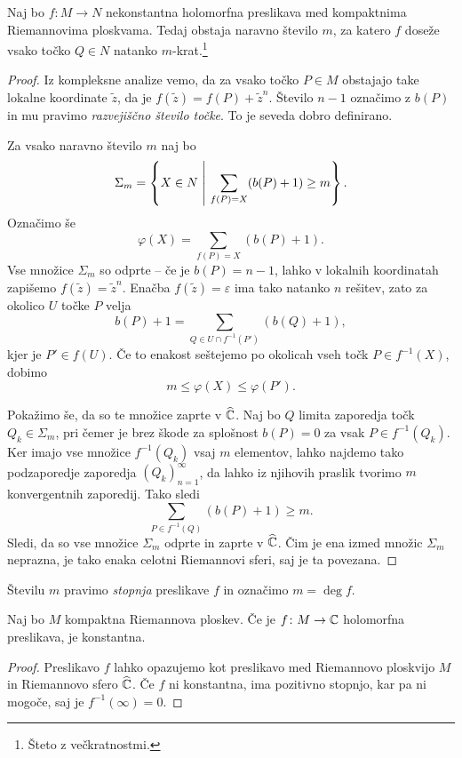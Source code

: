 \begin{trditev}
\label{td:deg}
Naj bo $f \colon M \to N$ nekonstantna holomorfna preslikava med
kompaktnima Riemannovima ploskvama. Tedaj obstaja naravno število
$m$, za katero $f$ doseže vsako točko $Q \in N$ natanko
$m$-krat.\footnote{Šteto z večkratnostmi.}
\end{trditev}

\begin{proof}
Iz kompleksne analize vemo, da za vsako točko $P \in M$ obstajajo
take lokalne koordinate $\tilde{z}$, da je
$f(\tilde{z}) = f(P) + \tilde{z}^n$. Število $n-1$ označimo z
$b(P)$ in mu pravimo \emph{razvejiščno število točke}. To je seveda
dobro definirano.

Za vsako naravno število $m$ naj bo
\[
\Sigma_m =
\left\{X \in N~\middle\vert~\sum_{f(P)=X} (b(P)+1) \geq m\right\}.
\]
Označimo še
\[
\varphi(X) = \sum_{f(P) = X} (b(P)+1).
\]
Vse množice $\Sigma_m$ so odprte -- če je $b(P) = n-1$, lahko v
lokalnih koordinatah zapišemo $f(\tilde{z}) = \tilde{z}^n$. Enačba
$f(\tilde{z}) = \varepsilon$ ima tako natanko $n$ rešitev, zato za
okolico $U$ točke $P$ velja
\[
b(P) + 1 = \sum_{Q \in U \cap f^{-1}(P')} (b(Q) + 1),
\]
kjer je $P' \in f(U)$. Če to enakost seštejemo po okolicah vseh
točk $P \in f^{-1}(X)$, dobimo
\[
m \leq \varphi(X) \leq \varphi(P').
\]

Pokažimo še, da so te množice zaprte v $\widehat{\mathbb{C}}$. Naj bo $Q$ limita
zaporedja točk $Q_k \in \Sigma_m$, pri čemer je brez škode za
splošnost $b(P) = 0$ za vsak $P \in f^{-1}(Q_k)$. Ker imajo vse
množice $f^{-1}(Q_k)$ vsaj $m$ elementov, lahko najdemo tako
podzaporedje zaporedja $(Q_k)_{n=1}^\infty$, da lahko iz njihovih
praslik tvorimo $m$ konvergentnih zaporedij. Tako sledi
\[
\sum_{P \in f^{-1}(Q)} (b(P)+1) \geq m.
\]
Sledi, da so vse množice $\Sigma_m$ odprte in zaprte v $\widehat{\mathbb{C}}$. Čim
je ena izmed množic $\Sigma_m$ neprazna, je tako enaka celotni
Riemannovi sferi, saj je ta povezana.
\end{proof}

Številu $m$ pravimo \emph{stopnja} preslikave $f$ in označimo
$m = \deg f$.

\begin{posledica}
Naj bo $M$ kompaktna Riemannova ploskev. Če je $f \colon M \to \mathbb{C}$
holomorfna preslikava, je konstantna.
\end{posledica}

\begin{proof}
Preslikavo $f$ lahko opazujemo kot preslikavo med Riemannovo
ploskvijo $M$ in Riemannovo sfero $\widehat{\mathbb{C}}$. Če $f$ ni konstantna, ima
pozitivno stopnjo, kar pa ni mogoče, saj je $f^{-1}(\infty) = 0$.
\end{proof}

